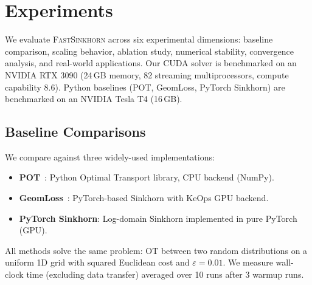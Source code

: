 
\section{Experiments}
\label{sec:experiments}

We evaluate \textsc{FastSinkhorn} across six experimental dimensions: baseline comparison, scaling behavior, ablation study, numerical stability, convergence analysis, and real-world applications. Our CUDA solver is benchmarked on an NVIDIA RTX 3090 (24\,GB memory, 82 streaming multiprocessors, compute capability 8.6). Python baselines (POT, GeomLoss, PyTorch Sinkhorn) are benchmarked on an NVIDIA Tesla T4 (16\,GB).

\subsection{Baseline Comparisons}
\label{sec:exp_baselines}

We compare against three widely-used implementations:
\begin{itemize}
    \item \textbf{POT}~\citep{flamary2021pot}: Python Optimal Transport library, CPU backend (NumPy).
    \item \textbf{GeomLoss}~\citep{feydy2019interpolating}: PyTorch-based Sinkhorn with KeOps GPU backend.
    \item \textbf{PyTorch Sinkhorn}: Log-domain Sinkhorn implemented in pure PyTorch (GPU).
\end{itemize}

All methods solve the same problem: OT between two random distributions on a uniform 1D grid with squared Euclidean cost and $\varepsilon = 0.01$. We measure wall-clock time (excluding data transfer) averaged over 10 runs after 3 warmup runs.

